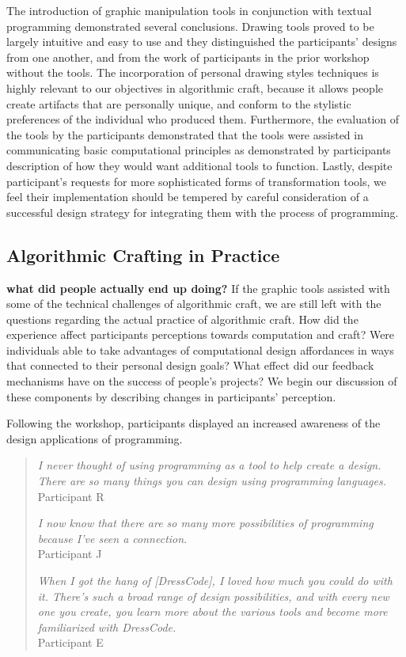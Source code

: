 \documentclass{sigchi}
\begin{document}
The introduction of graphic manipulation tools in conjunction with textual programming demonstrated several conclusions. Drawing tools proved to be largely intuitive and easy to use and they distinguished the participants' designs from one another, and from the work of participants in the prior workshop without the tools. The incorporation of personal drawing styles techniques is highly relevant to our objectives in algorithmic craft, because it allows people create artifacts that are personally unique, and conform to the stylistic preferences of the individual who produced them. Furthermore, the evaluation of the tools by the participants demonstrated that the tools were assisted in communicating basic computational principles as demonstrated by participants description of how they would want additional tools to function. Lastly, despite participant's requests for more sophisticated forms of transformation tools, we feel their implementation should be tempered by careful consideration of a successful design strategy for integrating them with the process of programming. 

\subsection{Algorithmic Crafting in Practice}
\textbf{what did people actually end up doing?}
If the graphic tools assisted with some of the technical challenges of algorithmic craft, we are still left with the questions regarding the actual practice of algorithmic craft. How did the experience affect participants perceptions towards computation and craft? Were individuals able to take advantages of computational design affordances in ways that connected to their personal design goals? What effect did our feedback mechanisms have on the success of people's projects? We begin our discussion of these components by describing changes in participants' perception. 

Following the workshop, participants displayed an increased awareness of the design applications of programming. 
\begin{quotation}
		\textit{I never thought of using programming as a tool to help create a design. There are so many things you can design using programming languages.}
		\\Participant R
		
		\textit{I now know that there are so many more possibilities of programming because I've seen a connection.}
		\\Participant J
		
		\textit{When I got the hang of [DressCode], I loved how much you could do with it. There's such a broad range of design possibilities, and with every new one you create, you learn more about the various tools and become more familiarized with DressCode.}
		\\Participant E
\end{quotation}
\end{document}
